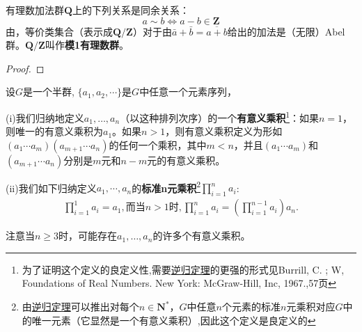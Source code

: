 \documentclass[../../main.tex]{subfiles}
\begin{document}
\begin{example}
有理数加法群$\boldsymbol{Q}$上的下列关系是同余关系：
\[a \sim b \Longleftrightarrow a - b \in \boldsymbol{Z}\]
由，等价类集合（表示成$\boldsymbol{Q}/\boldsymbol{Z}$）对于由$\bar{a} + \bar{b} = \overline{a + b}$给出的加法是（无限）Abel群。$\boldsymbol{Q}/\boldsymbol{Z}$叫作\textbf{模1有理数群}。
\end{example}
\begin{proof}

\end{proof}

\begin{definition}[有意义乘积和标准n元乘积]\label{definition:有意义乘积和标准n元乘积}
设$G$是一个半群, $\{a_1,a_2, \cdots\}$是$G$中任意一个元素序列，

(i)我们归纳地定义$a_1, \dots, a_n$（以这种排列次序）的一个\textbf{有意义乘积}\footnote{为了证明这个定义的良定义性,需要\hyperref[Set Theory-theorem:逆归定理]{逆归定理}的更强的形式见Burrill, C. ; W, Foundations of Real Numbers. New York: McGraw-Hill, Inc, 1967.,57页}：如果$n = 1$，则唯一的有意义乘积为$a_1$。如果$n > 1$，则有意义乘积定义为形如$(a_1 \cdots a_m)(a_{m + 1} \cdots a_n)$的任何一个乘积，其中$m < n$，并且$(a_1 \cdots a_m)$和$(a_{m + 1} \cdots a_n)$分别是$m$元和$n - m$元的有意义乘积。

(ii)我们如下归纳定义$a_1,\cdots,a_n$的\textbf{标准n元乘积}\footnote{由\hyperref[Set Theory-theorem:逆归定理]{逆归定理}可以推出对每个$n \in \boldsymbol{N}^*$，$G$中任意$n$个元素的标准$n$元乘积对应$G$中的唯一元素（它显然是一个有意义乘积）,因此这个定义是良定义的}$\prod_{i=1}^n{a_i}$:
\begin{align*}
\prod_{i=1}^1{a_i}=a_1,\text{而当}n>1\text{时},\prod_{i=1}^n{a_i}=\left( \prod_{i=1}^{n-1}{a_i} \right) a_n.
\end{align*}
\end{definition}
\begin{remark}
注意当$n \geqslant 3$时，可能存在$a_1, \dots, a_n$的许多个有意义乘积。
\end{remark}
\end{document}
